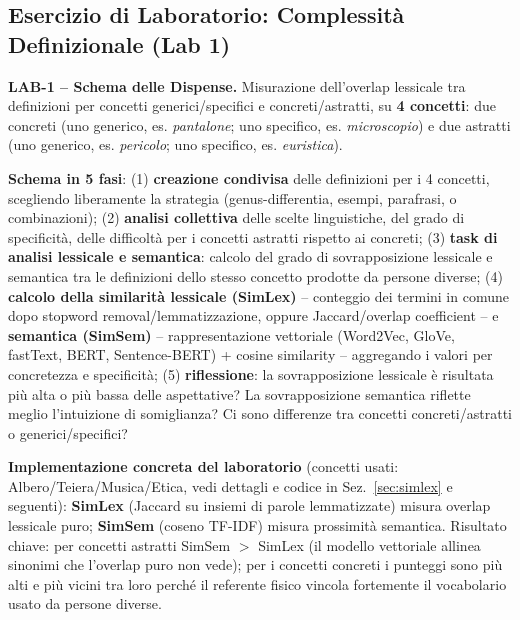 \documentclass[12pt,a4paper]{article}
\begin{document}
\subsection{Esercizio di Laboratorio: Complessit\`a Definizionale (Lab 1)}

\begin{defbox}
\textbf{LAB-1 -- Schema delle Dispense.}
Misurazione dell'overlap lessicale tra definizioni per concetti generici/specifici e concreti/astratti, su \textbf{4 concetti}: due concreti (uno generico, es. \textit{pantalone}; uno specifico, es. \textit{microscopio}) e due astratti (uno generico, es. \textit{pericolo}; uno specifico, es. \textit{euristica}).
\end{defbox}

\textbf{Schema in 5 fasi}: (1) \textbf{creazione condivisa} delle definizioni per i 4 concetti, scegliendo liberamente la strategia (genus-differentia, esempi, parafrasi, o combinazioni); (2) \textbf{analisi collettiva} delle scelte linguistiche, del grado di specificit\`a, delle difficolt\`a per i concetti astratti rispetto ai concreti; (3) \textbf{task di analisi lessicale e semantica}: calcolo del grado di sovrapposizione lessicale e semantica tra le definizioni dello stesso concetto prodotte da persone diverse; (4) \textbf{calcolo della similarit\`a lessicale (SimLex)} -- conteggio dei termini in comune dopo stopword removal/lemmatizzazione, oppure Jaccard/overlap coefficient -- e \textbf{semantica (SimSem)} -- rappresentazione vettoriale (Word2Vec, GloVe, fastText, BERT, Sentence-BERT) + cosine similarity -- aggregando i valori per concretezza e specificit\`a; (5) \textbf{riflessione}: la sovrapposizione lessicale \`e risultata pi\`u alta o pi\`u bassa delle aspettative? La sovrapposizione semantica riflette meglio l'intuizione di somiglianza? Ci sono differenze tra concetti concreti/astratti o generici/specifici?

\textbf{Implementazione concreta del laboratorio} (concetti usati: Albero/Teiera/Musica/Etica, vedi dettagli e codice in Sez.~\ref{sec:simlex} e seguenti): \textbf{SimLex} (Jaccard su insiemi di parole lemmatizzate) misura overlap lessicale puro; \textbf{SimSem} (coseno TF-IDF) misura prossimit\`a semantica. Risultato chiave: per concetti astratti SimSem $>$ SimLex (il modello vettoriale allinea sinonimi che l'overlap puro non vede); per i concetti concreti i punteggi sono pi\`u alti e pi\`u vicini tra loro perch\'e il referente fisico vincola fortemente il vocabolario usato da persone diverse.
\end{document}
